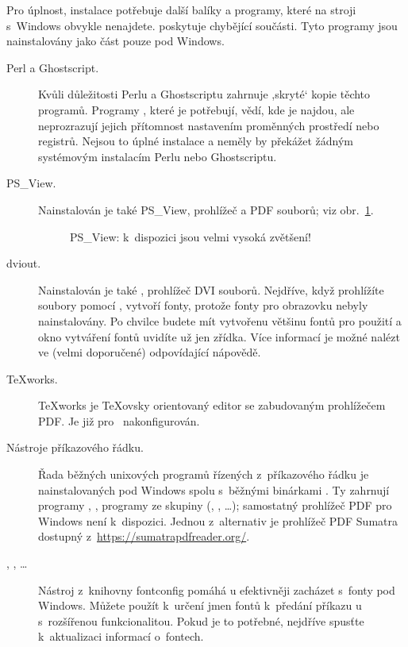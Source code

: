 \documentclass[\classoptions,slovak,english,czech]{\classname}
\newcommand{\singleuv}[1]{,#1`}
\begin{document}
Pro úplnost, instalace \TL{} potřebuje další balíky a programy,
které na stroji s~Windows obvykle nenajdete.
\TL{} poskytuje chybějící součásti. Tyto programy jsou nainstalovány jako 
část \TL{} pouze pod Windows.

\begin{description}
\item[Perl a Ghostscript.] Kvůli důležitosti Perlu a Ghostscriptu
  zahrnuje \TL{} \singleuv{skryté} kopie těchto programů.  
  Programy \TL{}, které je potřebují, vědí, kde je najdou, ale
  neprozrazují jejich přítomnost nastavením proměnných prostředí nebo 
  registrů. Nejsou to úplné instalace a neměly by překážet žádným 
  systémovým instalacím Perlu nebo Ghostscriptu.

\item[PS\_View.] Nainstalován je také PS\_View, prohlížeč \PS{}
  a PDF souborů; viz obr.~\ref{fig:psview}.

\begin{figure}[tb]
\centering{}
\caption{PS\_View: k~dispozici jsou velmi vysoká zvětšení!}\label{fig:psview}
\end{figure}

\item[dviout.] Nainstalován je také , prohlížeč
  DVI souborů.  Nejdříve, když prohlížíte soubory pomocí 
  , vytvoří fonty, 
  protože fonty pro obrazovku nebyly nainstalovány. Po chvilce 
  budete mít vytvořenu většinu fontů pro použití a okno 
  vytváření fontů uvidíte už jen zřídka.  Více informací
  je možné nalézt ve (velmi doporučené) odpovídající nápovědě.
\item[\TeX{}works.]  \TeX{}works je \TeX ovsky orientovaný
  editor se zabudovaným prohlížečem PDF. 
  Je již pro \TL\ nakonfigurován.

\item[Nástroje příkazového řádku.] Řada běžných unixových
  programů řízených z~příkazového řádku je nainstalovaných
  pod Windows spolu s~běžnými binárkami \TL. Ty zahrnují
  programy , ,%
  programy ze skupiny  (,
  , \ldots); samostatný prohlížeč PDF pro Windows
  není k~dispozici. Jednou z~alternativ je prohlížeč PDF Sumatra
  dostupný z~\url{https://sumatrapdfreader.org/}.
   
\item[, , \ldots] Nástroj z~knihovny 
  fontconfig pomáhá \XeTeX{}u efektivněji zacházet s~fonty pod Windows.  
  Můžete použít  k~určení jmen fontů 
  k~předání %
  příkazu \XeTeX{}u  s~rozšířenou funkcionalitou. 
  Pokud je to potřebné, nejdříve spusťte 
  k~aktualizaci informací o~fontech.
\end{description}
\end{document}
